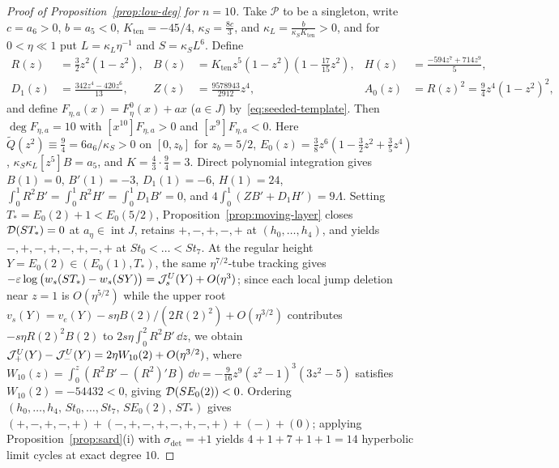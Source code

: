 \begin{proof}[Proof of Proposition~\ref{prop:low-deg} for $n=10$]
Take $\mathcal{P}$ to be a singleton, write $c=a_6>0$, $b=a_5<0$, $K_{\mathrm{ten}}=-45/4$, $\kappa_S=\frac{8c}{3}$, and $\kappa_L=\frac{b}{\kappa_S K_{\mathrm{ten}}}>0$, and for $0<\eta\ll 1$ put $L=\kappa_L\eta^{-1}$ and $S=\kappa_S L^6$. Define
\begin{align*}
  R(z) &= \tfrac32 z^2(1-z^2), & B(z) &= K_{\mathrm{ten}}z^5(1-z^2)\!\left(1-\tfrac{17}{15}z^2\right), & H(z) &= \tfrac{-594z^7+714z^9}{5},\\
  D_1(z) &= \frac{342z^4-420z^6}{13}, & Z(z) &= \frac{9578943}{2912}z^4, & A_0(z) &= R(z)^2 = \tfrac94 z^4(1-z^2)^2,
\end{align*}
and define $F_{\eta,a}(x)=F_\eta^0(x)+ax$ ($a\in J$) by~\eqref{eq:seeded-template}. Then $\deg F_{\eta,a}=10$ with $[x^{10}]F_{\eta,a}>0$ and $[x^9]F_{\eta,a}<0$. Here $\widetilde Q(z^2)\equiv\frac94=6a_6/\kappa_S>0$ on $[0,z_b]$ for $z_b=5/2$, $E_0(z)=\frac38 z^6(1-\frac32 z^2+\frac35 z^4)$, $\kappa_S\kappa_L[z^5]B=a_5$, and $K=\frac43\cdot\frac94=3$. Direct polynomial integration gives $B(1)=0$, $B'(1)=-3$, $D_1(1)=-6$, $H(1)=24$, $\int_0^1 R^2 B'=\int_0^1 R^2 H'=\int_0^1 D_1 B'=0$, and $4\int_0^1(ZB'+D_1 H')=9\Lambda$. Setting $T_*=E_0(2)+1<E_0(5/2)$, Proposition~\ref{prop:moving-layer} closes $\mathcal{D}(ST_*)=0$ at $a_\eta\in\operatorname{int}J$, retains $+,-,+,-,+$ at $(h_0,\dots,h_4)$, and yields $-,+,-,+,-,+,-,+$ at $St_0<\dots<St_7$. At the regular height $Y=E_0(2)\in(E_0(1),T_*)$, the same $\eta^{7/2}$-tube tracking gives $-\varepsilon\log\big(w_s(ST_*)-w_s(SY)\big)=\mathcal{J}_s^U(Y)+O(\eta^3)$; since each local jump deletion near $z=1$ is $O(\eta^{5/2})$ while the upper root $v_s(Y)=v_e(Y)-s\eta B(2)/(2R(2)^2)+O(\eta^{3/2})$ contributes $-s\eta R(2)^2 B(2)$ to $2s\eta\int_0^2 R^2 B'\,\dd z$, we obtain $\mathcal{J}_+^U(Y)-\mathcal{J}_-^U(Y)=2\eta W_{10}(2)+O(\eta^{3/2})$, where $W_{10}(z)=\int_0^z(R^2 B'-(R^2)'B)\,\dd v=-\frac{9}{16}z^9(z^2-1)^3(3z^2-5)$ satisfies $W_{10}(2)=-54432<0$, giving $\mathcal{D}(SE_0(2))<0$. Ordering $(h_0,\dots,h_4,\,St_0,\dots,St_7,\,SE_0(2),\,ST_*)$ gives $(+,-,+,-,+)+(-,+,-,+,-,+,-,+)+(-)+(0)$; applying Proposition~\ref{prop:sard}(i) with $\sigma_{\mathrm{det}}=+1$ yields $4+1+7+1+1=14$ hyperbolic limit cycles at exact degree $10$.
\end{proof}

